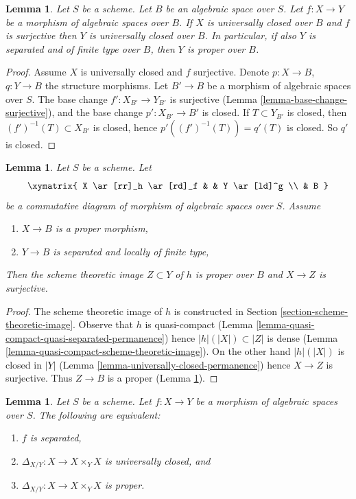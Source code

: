 \documentclass{stacks-project}
\theoremstyle{plain}
\newtheorem{lemma}[subsection]{Lemma}
\theoremstyle{definition}
\theoremstyle{remark}
\numberwithin{equation}{subsection}
\begin{document}
\begin{lemma}
\label{lemma-image-proper-is-proper}
Let $S$ be a scheme. Let $B$ be an algebraic space over $S$.
Let $f : X \to Y$ be a morphism of algebraic spaces over $B$.
If $X$ is universally closed over $B$ and $f$ is surjective then
$Y$ is universally closed over $B$. In particular, if also $Y$ is
separated and of finite type over $B$, then $Y$ is proper over $B$.
\end{lemma}

\begin{proof}
Assume $X$ is universally closed and $f$ surjective.
Denote $p : X \to B$, $q : Y \to B$ the structure morphisms.
Let $B' \to B$ be a morphism of algebraic spaces over $S$.
The base change $f' : X_{B'} \to Y_{B'}$ is surjective
(Lemma \ref{lemma-base-change-surjective}), and the base
change $p' : X_{B'} \to B'$ is closed.
If $T \subset Y_{B'}$ is closed, then $(f')^{-1}(T) \subset X_{B'}$
is closed, hence $p'((f')^{-1}(T)) = q'(T)$ is closed.
So $q'$ is closed.
\end{proof}

\begin{lemma}
\label{lemma-scheme-theoretic-image-is-proper}
Let $S$ be a scheme. Let
$$
\xymatrix{
X \ar[rr]_h \ar[rd]_f & & Y \ar[ld]^g \\
& B
}
$$
be a commutative diagram of morphism of algebraic spaces over $S$.
Assume
\begin{enumerate}
\item $X \to B$ is a proper morphism,
\item $Y \to B$ is separated and locally of finite type,
\end{enumerate}
Then the scheme theoretic image $Z \subset Y$ of $h$
is proper over $B$ and $X \to Z$ is surjective.
\end{lemma}

\begin{proof}
The scheme theoretic image of $h$ is constructed in Section
\ref{section-scheme-theoretic-image}.
Observe that $h$ is quasi-compact
(Lemma \ref{lemma-quasi-compact-quasi-separated-permanence})
hence $|h|(|X|) \subset |Z|$
is dense (Lemma \ref{lemma-quasi-compact-scheme-theoretic-image}).
On the other hand $|h|(|X|)$ is closed in $|Y|$
(Lemma \ref{lemma-universally-closed-permanence})
hence $X \to Z$ is surjective.
Thus $Z \to B$ is a proper (Lemma \ref{lemma-image-proper-is-proper}).
\end{proof}

\begin{lemma}
\label{lemma-separated-diagonal-proper}
Let $S$ be a scheme.
Let $f : X \to Y$ be a morphism of algebraic spaces over $S$.
The following are equivalent:
\begin{enumerate}
\item $f$ is separated,
\item $\Delta_{X/Y} : X \to X \times_Y X$ is universally closed, and
\item $\Delta_{X/Y} : X \to X \times_Y X$ is proper.
\end{enumerate}
\end{lemma}
\end{document}

